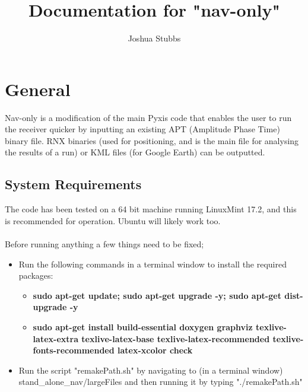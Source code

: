 \documentclass[10pt,a4paper]{article}
\author{Joshua Stubbs}
\title{Documentation for "nav-only"}
\begin{document}
\maketitle
\noindent



\section{General}
Nav-only is a modification of the main Pyxis code that enables the user to run the receiver quicker by inputting an existing APT (Amplitude Phase Time) binary file. RNX binaries (used for positioning, and is the main file for analysing the results of a run) or KML files (for Google Earth) can be outputted. \subsection{System Requirements}
The code has been tested on a 64 bit machine running LinuxMint 17.2, and this is recommended for operation. Ubuntu will likely work too. \\ \\
\noindent
Before running anything a few things need to be fixed;
\begin{itemize}
\item Run the following commands in a terminal window to install the required packages:
\begin{itemize}
\item \textbf{sudo apt-get update; sudo apt-get upgrade -y; sudo apt-get dist-upgrade -y}
\item \textbf{sudo apt-get install build-essential doxygen graphviz texlive-latex-extra texlive-latex-base texlive-latex-recommended texlive-fonts-recommended latex-xcolor check}
\end{itemize} 
\item Run the script "remakePath.sh" by navigating to (in a terminal window) stand\_alone\_nav/largeFiles and then running it by typing "./remakePath.sh"
\end{itemize}
\end{document}

